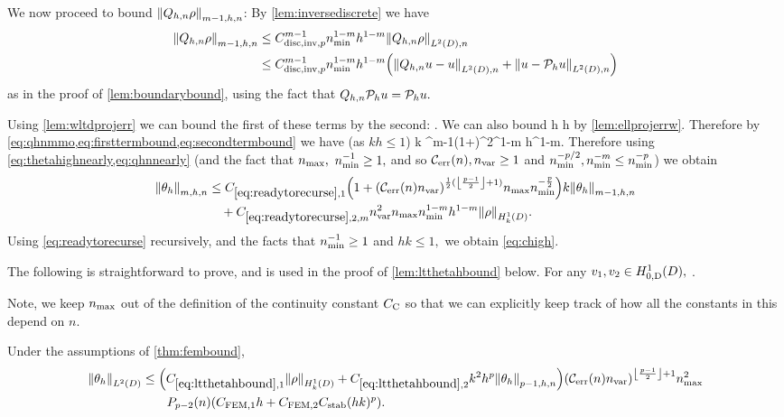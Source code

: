 We now proceed to bound $\Nfn{m-1,h,n}{\Qhn \rho}$: By \cref{lem:inversediscrete} we have
\begin{align}
  \Nfn{m-1,h,n}{\Qhn \rho} &\leq\Chinv^{m-1} \nmin^{1-m}h^{1-m} \NLtDn{\Qhn\rho}\nonumber\\
  &\leq \Chinv^{m-1} \nmin^{1-m}h^{1-m} \mleft(\NLtDn{\Qhn u - u} + \NLtDn{u-\Ph u}\mright)\label{eq:qhnmmo}
\end{align}
as in the proof of \cref{lem:boundarybound}, using the fact that $Q_{h,n} \mathcal P_{h} u = \mathcal P_{h} u.$

Using \cref{lem:wltdprojerr} we can bound the first of these terms by the second:
\beq\label{eq:firsttermbound}
 \leq {} \nvar {}.
\eeq
We can also bound
\beq\label{eq:secondtermbound}
 \leq {} \nvar h  \leq {} \nvar\nmax h \NHokD{\rho}
\eeq
by \cref{lem:ellprojerrw}. Therefore by \cref{eq:qhnmmo,eq:firsttermbound,eq:secondtermbound} we have (as $kh \leq 1$)
\beq\label{eq:qhnnearly}
k  \leq \Chinv^{m-1}\Cwz \mleft(1+\mright)\nvar^2\nmax\nmin^{1-m} h^{1-m}\NHokD{\rho}.
\eeq
Therefore using \cref{eq:thetahighnearly,eq:qhnnearly} (and the fact that $n_{\max},$ $n_{\min}^{-1} \geq 1,$ and so $\En, \nvar \geq1$ and $n_{\min}^{-p/2}, n_{\min}^{-m} \leq n_{\min}^{-p}$)  we obtain
\begin{align}
  \Nfn{m,h,n}{\thetah} &\leq \CReco \mleft(1+\mleft(\En\nvar\mright)^{\half(\floor{\frac{p-1}2}+1)}\nmax\nmin^{-\frac{p}2}\mright)k \Nfn{m-1,h,n}{\thetah}\nonumber\\
  &\quad+ \CRectfn{m} \nvar^2\nmax\nmin^{1-m} h^{1-m} \NHokD{\rho}.\label{eq:readytorecurse}
\end{align}
Using \cref{eq:readytorecurse} recursively, and the facts that $n_{\min}^{-1} \geq 1$ and $hk \leq 1,$ we obtain \cref{eq:chigh}.
\epf

The following  is straightforward to prove, and is used in the proof of \cref{lem:ltthetahbound} below.
\ble[Continuity of $\aT$]\label{lem:continuity}
For any $\vo, \vt \in \HozDD,$
\beqs
\abs{\aT(\vo,\vt)} \leq \Cc \nmax \NHokD{\vo}\NHokD{\vt}.
\eeqs
\ele

Note, we keep $n_{\max}$ out of the definition of the continuity constant $C_{\mathrm{C}}$ so that we can explicitly keep track of how all the constants in this  depend on $n$.

\label{lem:ltthetahbound}
Under the assumptions of \cref{thm:fembound},%
\begin{align}
\NLtD{\thetah}&\leq \mleft(\Cfirst\NHokD{\rho} +\Csecond  k^2h^p\Nfn{p-1,h,n}{\thetah}\mright)\mleft(\En \nvar\mright)^{\floor{\frac{p-1}2}+1}\nmax^2\nonumber\\
&\quad\quad\Pfn{p-2}\mleft(n\mright)\mleft(\CFEMotilde h + \CFEMttilde \CAnk (hk)^p\mright).\label{eq:ltthetahbound}
\end{align}
\ele

